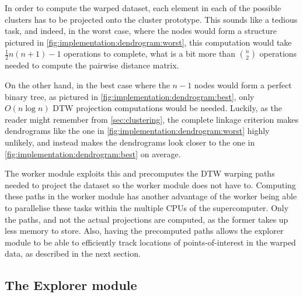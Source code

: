 \documentclass[parskip]{cs4rep}
\begin{document}
In order to compute the warped dataset, each element in each of the possible clusters has to be projected onto the cluster prototype. This sounds like a tedious task, and indeed, in the worst case,  where the nodes would form a structure pictured in \autoref{fig:implementation:dendrogram:worst}, this computation would take $\frac{1}{2} n(n+1) - 1$ operations to complete, what is a bit more than ${n \choose 2}$ operations needed to compute the pairwise distance matrix. 

On the other hand, in the best case where the $n-1$ nodes would form a perfect binary tree, as pictured in \autoref{fig:implementation:dendrogram:best}, only $O(n \log n)$ DTW projection computations would be needed. Luckily, as the reader might remember from \autoref{sec:clustering}, the complete linkage criterion makes dendrograms like the one in \autoref{fig:implementation:dendrogram:worst} highly unlikely, and instead makes the dendrograms look closer to the one in \autoref{fig:implementation:dendrogram:best} on average. 

The worker module exploits this and precomputes the DTW warping paths needed to project the dataset so the worker module does not have to. Computing these paths in the worker module has another advantage of the worker being able to parallelise these tasks within the multiple CPUs of the supercomputer. Only the paths, and not the actual projections are computed, as the former takes up less memory to store. Also, having the precomputed paths allows the explorer module to be able to efficiently track locations of points-of-interest in the warped data, as described in the next section.

\subsection{The Explorer module}
\end{document}
